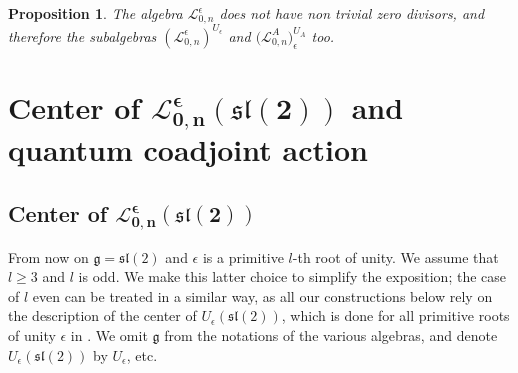 \documentclass[pdftex]{sigma}%
\numberwithin{equation}{section}
\numberwithin{figure}{section}
\newtheorem{prop}[teo]{Proposition}
\newcommand{\e}{\epsilon}
\newcommand{\Ll}{{\mathcal L}}
\begin{document}
\begin{prop}%
The algebra $\Ll_{0,n}^\epsilon$ does not have non trivial zero divisors, and therefore the subalgebras $(\Ll_{0,n}^\e)^{U_\e}$ and $\big(\Ll_{0,n}^A\big)^{U_A}_\e$ too.
\end{prop}

\section[Center of L\_\{0,n\}\textasciicircum{}{e}(sl(2)) and quantum coadjoint action]
{Center of $\boldsymbol{\Ll_{0,n}^\e({\mathfrak{sl}}(2))}$ and quantum coadjoint action}
\label{specialization}

\subsection[Center of L\_\{0,n\}\textasciicircum{}{e}(sl(2))]
{Center of $\boldsymbol{\Ll_{0,n}^\e({\mathfrak{sl}}(2))}$}\label{centersl2}

From now on $\mathfrak{g} = {\mathfrak{sl}}(2)$ and $\e$ is a primitive $l$-th root of unity. We assume that $l\geq 3$ and $l$ is odd. We make this latter choice to simplify the exposition; the case of $l$ even can be treated in a similar way, as all our constructions below rely on the description of the center of $U_\e({\mathfrak{sl}}(2))$, which is done for all primitive roots of unity $\e$ in \cite[Section~3]{DC-K}. We omit $\mathfrak{g}$ from the notations of the various algebras, and denote $U_\epsilon({\mathfrak{sl}}(2))$ by $U_\epsilon$, etc.
\end{document}
